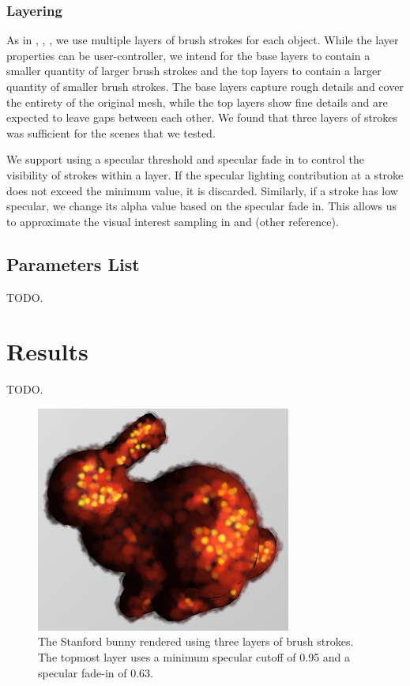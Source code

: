 \documentclass[conference]{acmsiggraph}
\begin{document}
\subsubsection{Layering}

As in \cite{Hertzmann:1998:PRC:280814.280951},
\cite{Meier:1996:PRA:237170.237288}, \cite{Lu:2010:IPS:1730804.1730825}, we use
multiple layers of brush strokes for each object. While the layer properties
can be user-controller, we intend for the base layers to contain a smaller
quantity of larger brush strokes and the top layers to contain a larger
quantity of smaller brush strokes. The base layers capture rough details and
cover the entirety of the original mesh, while the top layers show fine details
and are expected to leave gaps between each other. We found that three layers
of strokes was sufficient for the scenes that we tested.

We support using a specular threshold and specular fade in to control the
visibility of strokes within a layer. If the specular lighting contribution at
a stroke does not exceed the minimum value, it is discarded. Similarly, if a
stroke has low specular, we change its alpha value based on the specular fade
in. This allows us to approximate the visual interest sampling in
\cite{Hertzmann:1998:PRC:280814.280951} and (other reference).


\subsection{Parameters List}

TODO.


\section{Results}

TODO.

\begin{figure}[ht]
  \centering
  \includegraphics[width=3.3in]{images/bunny_with_fade_in}
  \caption{The Stanford bunny rendered using three layers of brush strokes.
           The topmost layer uses a minimum specular cutoff of 0.95 and a
           specular fade-in of 0.63.}
\end{figure}
\end{document}
